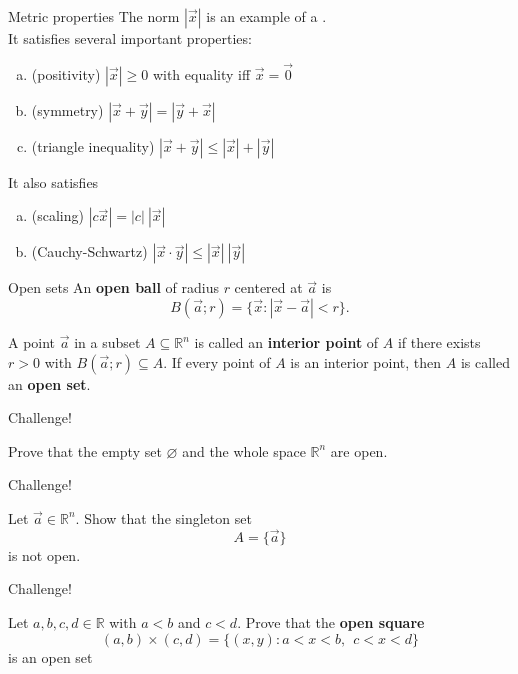 \documentclass{beamer}
\begin{document}
\begin{frame}{Metric properties}
\pause
The norm $|\vec x|$ is an example of a .\\
\pause
It satisfies several important properties:
\pause
\begin{thm}
\begin{enumerate}[(a)]
\pause
\item (positivity) $|\vec x| \geq 0$ with equality iff $\vec x = \vec 0$
\pause
\item (symmetry) $|\vec x + \vec y| = |\vec y + \vec x|$
\pause
\item (triangle inequality) $|\vec x + \vec y| \leq |\vec x| + | \vec y|$
\end{enumerate}
\end{thm}
\pause
It also satisfies 
\pause
\begin{enumerate}[(a)]
\pause
\item (scaling)  $|c\vec x| = |c|\ |\vec x|$
\pause
\item (Cauchy-Schwartz) $|\vec x\cdot\vec y|\leq |\vec x|\ |\vec y|$
\end{enumerate}
\end{frame}

\begin{frame}{Open sets}
An \textbf{open ball} of radius $r$ centered at $\vec a$ is
\pause
$$B(\vec a;r)  = \{\vec x: |\vec x-\vec a| < r\}.$$
\pause
\begin{defn}
\pause
A point $\vec a$ in a subset $A\subseteq\mathbb{R}^n$ is called an \textbf{interior point} of $A$ if there exists $r>0$ with
$B(\vec a; r)\subseteq A$.
\pause
If every point of $A$ is an interior point, then $A$ is called an \textbf{open set}.
\end{defn}
\end{frame}

\begin{frame}{Challenge!}
\begin{prob}
Prove that the empty set $\varnothing$ and the whole space $\mathbb{R}^n$ are open.
\end{prob}
\end{frame}

\begin{frame}{Challenge!}
\begin{prob}
Let $\vec a\in\mathbb{R}^n$.
Show that the singleton set
$$A = \{\vec a\}$$
is not open.
\end{prob}
\end{frame}


\begin{frame}{Challenge!}
\begin{prob}
Let $a,b,c,d\in\mathbb{R}$ with $a < b$ and $c < d$.
Prove that the \textbf{open square}
$$(a,b)\times (c,d) = \{(x,y): a < x < b,\ \ c < x < d\}$$
is an open set
\end{prob}
\end{frame}
\end{document}
